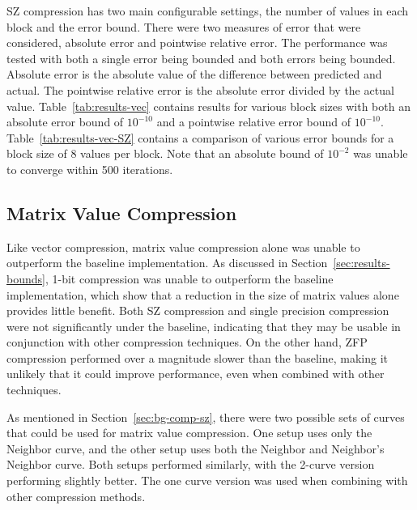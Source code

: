 

SZ compression has two main configurable settings, the number of values in each block and the error bound.
There were two measures of error that were considered, absolute error and pointwise relative error.
The performance was tested with both a single error being bounded and both errors being bounded.
Absolute error is the absolute value of the difference between predicted and actual.
The pointwise relative error is the absolute error divided by the actual value.
Table~\ref{tab:results-vec} contains results for various block sizes with both an absolute error bound of \(10^{-10}\) and a pointwise relative error bound of \(10^{-10}\).
Table~\ref{tab:results-vec-SZ} contains a comparison of various error bounds for a block size of 8 values per block.
Note that an absolute bound of \(10^{-2}\) was unable to converge within 500 iterations.



\subsection{Matrix Value Compression}
Like vector compression, matrix value compression alone was unable to outperform the baseline implementation.
As discussed in Section~\ref{sec:results-bounds}, 1-bit compression was unable to outperform the baseline implementation, which show that a reduction in the size of matrix values alone provides little benefit.
Both SZ compression and single precision compression were not significantly under the baseline, indicating that they may be usable in conjunction with other compression techniques.
On the other hand, ZFP compression performed over a magnitude slower than the baseline, making it unlikely that it could improve performance, even when combined with other techniques.

As mentioned in Section~\ref{sec:bg-comp-sz}, there were two possible sets of curves that could be used for matrix value compression.
One setup uses only the Neighbor curve, and the other setup uses both the Neighbor and Neighbor's Neighbor curve.
Both setups performed similarly, with the 2-curve version performing slightly better.
The one curve version was used when combining with other compression methods.

